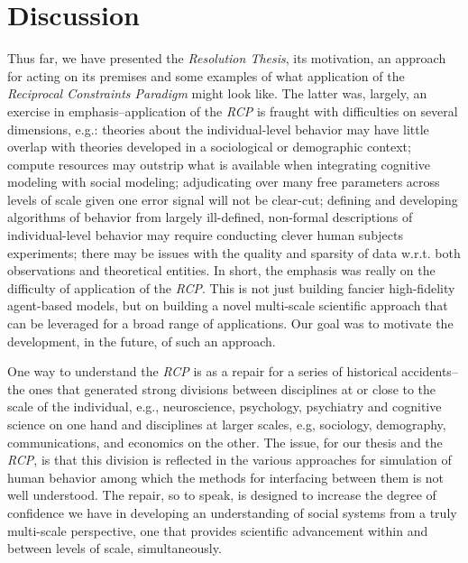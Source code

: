 \documentclass{article}
\begin{document}
\section{Discussion}
Thus far, we have presented the \textit{Resolution Thesis}, its motivation, an approach for acting on its premises and some examples of what application of the \textit{Reciprocal Constraints Paradigm} might look like.  The latter was, largely, an exercise in emphasis--application of the \textit{RCP} is fraught with difficulties on several dimensions, e.g.:  theories about the individual-level behavior may have little overlap with theories developed in a sociological or demographic context; compute resources may outstrip what is available when integrating cognitive modeling with social modeling; adjudicating over many free parameters across levels of scale given one error signal will not be clear-cut; defining and developing algorithms of behavior from largely ill-defined, non-formal descriptions of individual-level behavior may require conducting clever human subjects experiments; there may be issues with the quality and sparsity of data w.r.t. both observations and theoretical entities.  In short, the emphasis was really on the difficulty of application of the \textit{RCP}.  This is not just building fancier high-fidelity agent-based models, but on building a novel multi-scale scientific approach that can be leveraged for a broad range of applications.  Our goal was to motivate the development, in the future, of such an approach.
  
One way to understand the \textit{RCP} is as a repair for a series of historical accidents--the ones that generated strong divisions between disciplines at or close to the scale of the individual, e.g.,  neuroscience, psychology, psychiatry and cognitive science on one hand and disciplines at larger scales, e.g, sociology, demography, communications, and economics on the other.  The issue, for our thesis and the \textit{RCP}, is that this division is reflected in the various approaches for simulation of human behavior among which the methods for interfacing between them is not well understood.  The repair, so to speak, is designed to increase the degree of confidence we have in developing an understanding of social systems from a truly multi-scale perspective, one that provides scientific advancement within and between levels of scale, simultaneously. 
\end{document}
